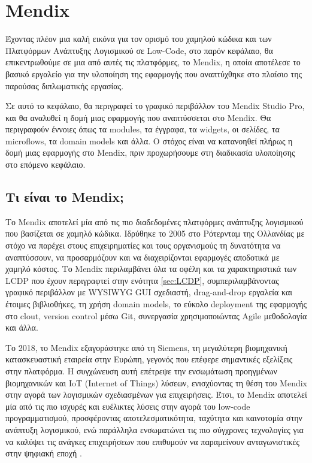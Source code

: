 \chapter{Mendix} \label{ch:mendix}
    Έχοντας πλέον μια καλή εικόνα για τον ορισμό του χαμηλού κώδικα και των Πλατφόρμων Ανάπτυξης Λογισμικού σε Low-Code, στο παρόν κεφάλαιο, θα επικεντρωθούμε σε μια από αυτές τις πλατφόρμες, το Mendix, η οποία αποτέλεσε το βασικό εργαλείο για την υλοποίηση της εφαρμογής που αναπτύχθηκε στο πλαίσιο της παρούσας διπλωματικής εργασίας.

    Σε αυτό το κεφάλαιο, θα περιγραφεί το γραφικό περιβάλλον του Mendix Studio Pro, και θα αναλυθεί η δομή μιας εφαρμογής που αναπτύσσεται στο Mendix. Θα περιγραφούν έννοιες όπως τα modules, τα έγγραφα, τα widgets, οι σελίδες, τα microflows, τα domain models και άλλα. Ο στόχος είναι να κατανοηθεί πλήρως η δομή μιας εφαρμογής στο Mendix, πριν προχωρήσουμε στη διαδικασία υλοποίησης στο επόμενο κεφάλαιο.

    \section{Τι είναι το Mendix;}
        Το Mendix αποτελεί μία από τις πιο διαδεδομένες πλατφόρμες ανάπτυξης λογισμικού που βασίζεται σε χαμηλό κώδικα. Ιδρύθηκε το 2005 στο Ρότερνταμ της Ολλανδίας με στόχο να παρέχει στους επιχειρηματίες και τους οργανισμούς τη δυνατότητα να αναπτύσσουν, να προσαρμόζουν και να διαχειρίζονται εφαρμογές αποδοτικά με χαμηλό κόστος. Το Mendix περιλαμβάνει όλα τα οφέλη και τα χαρακτηριστικά των LCDP που έχουν περιγραφτεί στην ενότητα \ref{sec:LCDP}, συμπεριλαμβάνοντας γραφικό περιβάλλον με WYSIWYG GUI σχεδιαστή, drag-and-drop εργαλεία και έτοιμες βιβλιοθήκες, τη χρήση domain models, το εύκολο deployment της εφαρμογής στο clout, version control μέσω Git, συνεργασία χρησιμοποιώντας Agile μεθοδολογία και άλλα.

        Το 2018, το Mendix εξαγοράστηκε από τη Siemens, τη μεγαλύτερη βιομηχανική κατασκευαστική εταιρεία στην Ευρώπη, γεγονός που επέφερε σημαντικές εξελίξεις στην πλατφόρμα. Η συγχώνευση αυτή επέτρεψε την ενσωμάτωση προηγμένων βιομηχανικών και IoT (Internet of Things) λύσεων, ενισχύοντας τη θέση του Mendix στην αγορά των λογισμικών σχεδιασμένων για επιχειρήσεις. Έτσι, το Mendix αποτελεί μία από τις πιο ισχυρές και ευέλικτες λύσεις στην αγορά του low-code προγραμματισμού, προσφέροντας αποτελεσματικότητα, ταχύτητα και καινοτομία στην ανάπτυξη λογισμικού, ενώ παράλληλα ενσωματώνει τις πιο σύγχρονες τεχνολογίες για να καλύψει τις ανάγκες επιχειρήσεων που επιθυμούν να παραμείνουν ανταγωνιστικές στην ψηφιακή εποχή \cite{LowCodeMendix}.

